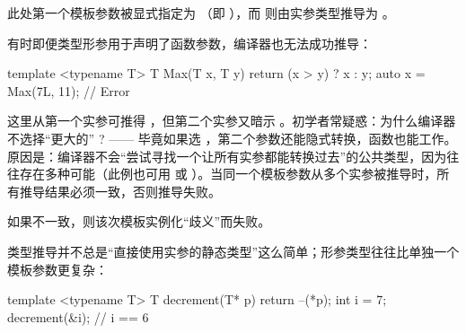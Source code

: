 此处第一个模板参数被显式指定为 （即 ），而  则由实参类型推导为 。

有时即便类型形参用于声明了函数参数，编译器也无法成功推导：

\begin{code}
template <typename T> T Max(T x, T y) {
  return (x > y) ? x : y;
}
auto x = Max(7L, 11); // Error
\end{code}

这里从第一个实参可推得 ，但第二个实参又暗示 。初学者常疑惑：为什么编译器不选择“更大的” ? —— 毕竟如果选 ，第二个参数还能隐式转换，函数也能工作。原因是：编译器不会“尝试寻找一个让所有实参都能转换过去”的公共类型，因为往往存在多种可能（此例也可用  或 ）。当同一个模板参数从多个实参被推导时，所有推导结果必须一致，否则推导失败。

如果不一致，则该次模板实例化“歧义”而失败。

类型推导并不总是“直接使用实参的静态类型”这么简单；形参类型往往比单独一个模板参数更复杂：

\begin{code}
template <typename T> T decrement(T* p) {
  return --(*p);
}
int i = 7;
decrement(&i);    // i == 6
\end{code}

